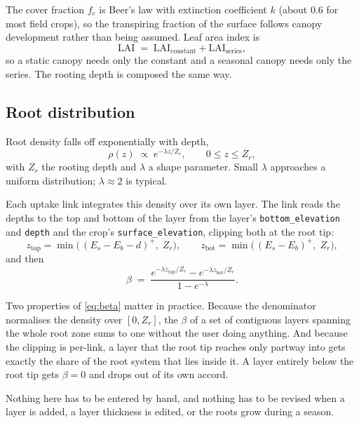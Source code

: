 \documentclass[11pt,a4paper]{article}
\newcommand{\code}[1]{\texttt{\small #1}}
\begin{document}
The cover fraction $f_c$ is Beer's law with extinction coefficient $k$ (about
$0.6$ for most field crops), so the transpiring fraction of the surface follows
canopy development rather than being assumed. Leaf area index is
\begin{equation}
\mathrm{LAI} \;=\; \mathrm{LAI}_{\text{constant}} + \mathrm{LAI}_{\text{series}},
\end{equation}
so a static canopy needs only the constant and a seasonal canopy needs only the
series. The rooting depth is composed the same way.

\subsection{Root distribution}

Root density falls off exponentially with depth,
\begin{equation}
\rho(z) \;\propto\; e^{-\lambda z / Z_r}, \qquad 0 \le z \le Z_r ,
\end{equation}
with $Z_r$ the rooting depth and $\lambda$ a shape parameter. Small $\lambda$
approaches a uniform distribution; $\lambda \approx 2$ is typical.

Each uptake link integrates this density over its own layer. The link reads the
depths to the top and bottom of the layer from the layer's
\code{bottom\_elevation} and \code{depth} and the crop's
\code{surface\_elevation}, clipping both at the root tip:
\begin{equation}
z_{\text{top}} = \min\bigl(\,(E_s - E_b - d)^+,\; Z_r \bigr),
\qquad
z_{\text{bot}} = \min\bigl(\,(E_s - E_b)^+,\; Z_r \bigr),
\end{equation}
and then
\begin{equation}
\beta \;=\; \frac{e^{-\lambda z_{\text{top}}/Z_r} - e^{-\lambda z_{\text{bot}}/Z_r}}
                 {1 - e^{-\lambda}} .
\label{eq:beta}
\end{equation}

Two properties of \eqref{eq:beta} matter in practice. Because the denominator
normalises the density over $[0, Z_r]$, the $\beta$ of a set of contiguous
layers spanning the whole root zone sums to one without the user doing
anything. And because the clipping is per-link, a layer that the root tip
reaches only partway into gets exactly the share of the root system that lies
inside it. A layer entirely below the root tip gets $\beta = 0$ and drops out
of its own accord.

Nothing here has to be entered by hand, and nothing has to be revised when a
layer is added, a layer thickness is edited, or the roots grow during a season.
\end{document}
